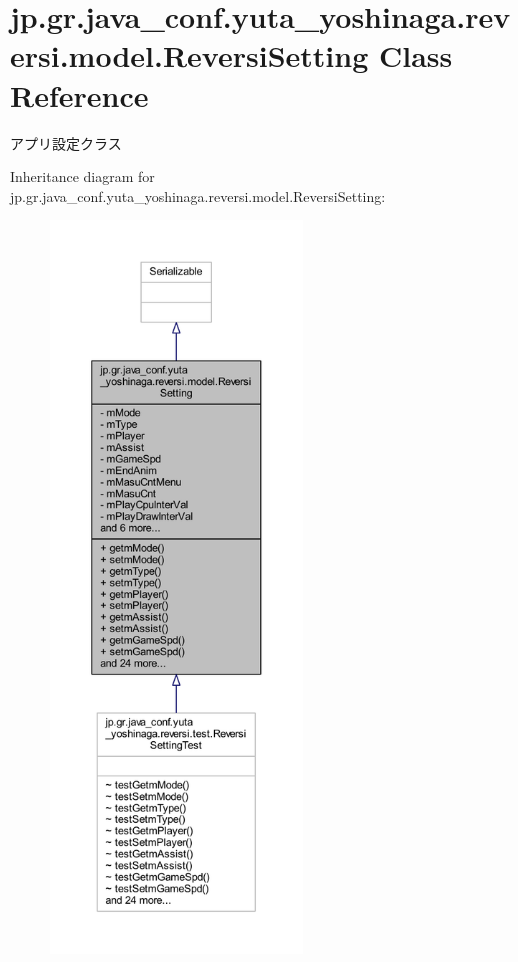 \hypertarget{classjp_1_1gr_1_1java__conf_1_1yuta__yoshinaga_1_1reversi_1_1model_1_1_reversi_setting}{}\section{jp.\+gr.\+java\+\_\+conf.\+yuta\+\_\+yoshinaga.\+reversi.\+model.\+Reversi\+Setting Class Reference}
\label{classjp_1_1gr_1_1java__conf_1_1yuta__yoshinaga_1_1reversi_1_1model_1_1_reversi_setting}


アプリ設定クラス  




Inheritance diagram for jp.\+gr.\+java\+\_\+conf.\+yuta\+\_\+yoshinaga.\+reversi.\+model.\+Reversi\+Setting\+:
\nopagebreak
\begin{figure}[H]
\begin{center}
\leavevmode
\includegraphics[height=550pt]{classjp_1_1gr_1_1java__conf_1_1yuta__yoshinaga_1_1reversi_1_1model_1_1_reversi_setting__inherit__graph}
\end{center}
\end{figure}


